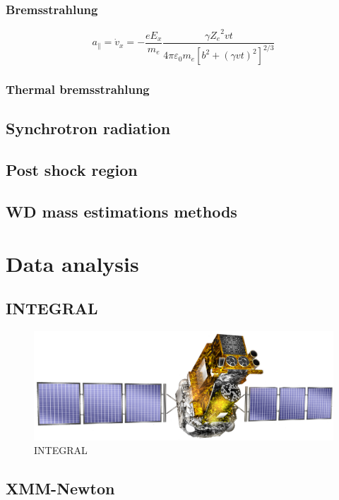 \documentclass[oneside,a4paper,11pt]{report}
\begin{document}
\subsection{Bremsstrahlung}
\begin{equation}
 a_{\parallel} = \dot{v}_x = -\frac{eE_x}{m_e}\frac{\gamma {Z_e}^2 vt}{4\pi \varepsilon_0 m_e \left [ b^2 + \left ( \gamma vt \right )^2  \right ]^{2/3}} 
\end{equation}

\subsection{Thermal bremsstrahlung}



\section{Synchrotron radiation}
\section{Post shock region}
\section{WD mass estimations methods}

\chapter{Data analysis}

\section{INTEGRAL}

\begin{figure}[!hbt]
\centering
\includegraphics[totalheight=4cm]{integral}
\caption{INTEGRAL}
\label{microblazar} 
\end{figure}


\section{XMM-Newton}
\end{document}

